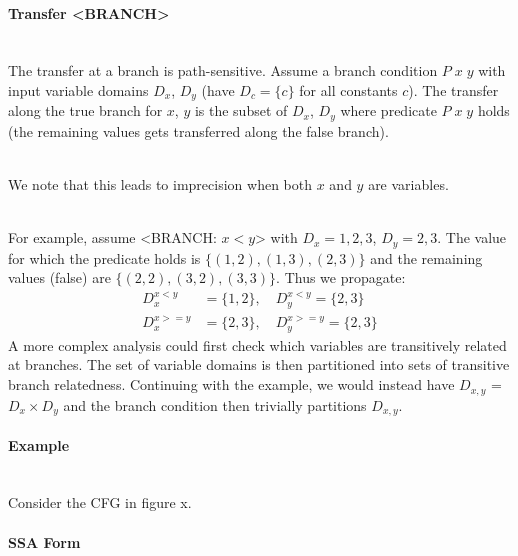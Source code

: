 \documentclass[a4paper]{article}
\newcommand{\NL}[0]{ \hfill\\\noindent }
\begin{document}
\paragraph{Transfer <BRANCH>}\NL
The transfer at a branch is path-sensitive. Assume a branch condition $P\;x\;y$ with input variable domains $D_x$, $D_y$ (have $D_c = \{c\}$ for all constants $c$).  The transfer along the true branch for $x$, $y$ is the subset of $D_x$, $D_y$ where predicate $P\;x\;y$ holds (the remaining values gets transferred along the false branch).

\NL
We note that this leads to imprecision when both $x$ and $y$ are variables. 

\NL
For example, assume <BRANCH: $x < y$> with $D_x = {1,2,3}$, $D_y = {2,3}$. The value for which the predicate holds is $\{(1,2), (1,3), (2,3)\}$ and the remaining values (false) are $\{(2,2), (3,2), (3,3)\}$. Thus we propagate:
\begin{align*}
D_x^{x < y} &= \{1, 2\} , \quad D_y^{x < y}  = \{2,3\} \\
D_x^{x >= y} &= \{2,3\} , \quad D_y^{x >= y} = \{2,3\} 
\end{align*}
\noindent
A more complex analysis could first check which variables are transitively related at branches. The set of variable domains is then partitioned into sets of transitive branch relatedness. Continuing with the example, we would instead have $D_{x,y}$ = $D_x \times D_y$ and the branch condition then trivially partitions $D_{x,y}$. 

\paragraph{Example}\NL
Consider the CFG in figure x.

\paragraph{SSA Form}\NL



%
%
%
%
%
\end{document}
